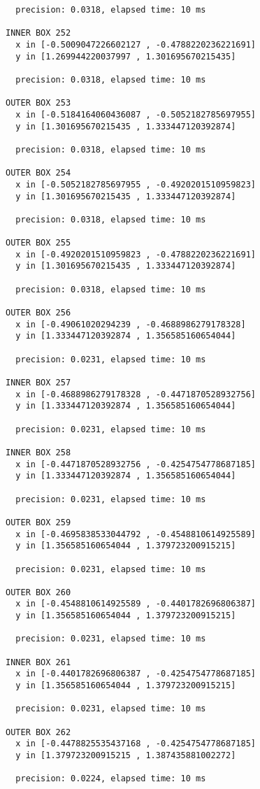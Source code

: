 \begin{verbatim}
  precision: 0.0318, elapsed time: 10 ms

INNER BOX 252
  x in [-0.5009047226602127 , -0.4788220236221691]
  y in [1.269944220037997 , 1.301695670215435]

  precision: 0.0318, elapsed time: 10 ms

OUTER BOX 253
  x in [-0.5184164060436087 , -0.5052182785697955]
  y in [1.301695670215435 , 1.333447120392874]

  precision: 0.0318, elapsed time: 10 ms

OUTER BOX 254
  x in [-0.5052182785697955 , -0.4920201510959823]
  y in [1.301695670215435 , 1.333447120392874]

  precision: 0.0318, elapsed time: 10 ms

OUTER BOX 255
  x in [-0.4920201510959823 , -0.4788220236221691]
  y in [1.301695670215435 , 1.333447120392874]

  precision: 0.0318, elapsed time: 10 ms

OUTER BOX 256
  x in [-0.49061020294239 , -0.4688986279178328]
  y in [1.333447120392874 , 1.356585160654044]

  precision: 0.0231, elapsed time: 10 ms

INNER BOX 257
  x in [-0.4688986279178328 , -0.4471870528932756]
  y in [1.333447120392874 , 1.356585160654044]

  precision: 0.0231, elapsed time: 10 ms

INNER BOX 258
  x in [-0.4471870528932756 , -0.4254754778687185]
  y in [1.333447120392874 , 1.356585160654044]

  precision: 0.0231, elapsed time: 10 ms

OUTER BOX 259
  x in [-0.4695838533044792 , -0.4548810614925589]
  y in [1.356585160654044 , 1.379723200915215]

  precision: 0.0231, elapsed time: 10 ms

OUTER BOX 260
  x in [-0.4548810614925589 , -0.4401782696806387]
  y in [1.356585160654044 , 1.379723200915215]

  precision: 0.0231, elapsed time: 10 ms

INNER BOX 261
  x in [-0.4401782696806387 , -0.4254754778687185]
  y in [1.356585160654044 , 1.379723200915215]

  precision: 0.0231, elapsed time: 10 ms

OUTER BOX 262
  x in [-0.4478825535437168 , -0.4254754778687185]
  y in [1.379723200915215 , 1.387435881002272]

  precision: 0.0224, elapsed time: 10 ms


\end{verbatim}
